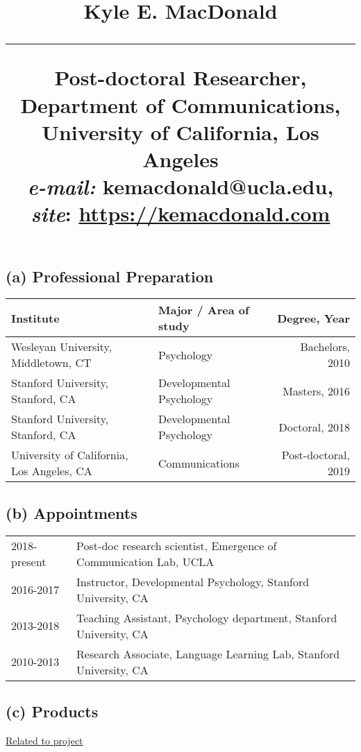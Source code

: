 \documentclass[svgnames,11pt]{article}
\title{%
        \vspace{-2\baselineskip}
            \normalsize
            {\textbf{Kyle E. MacDonald }}\\
            \vspace{0.5\baselineskip}
            \hrule
            \vspace{0.5\baselineskip}
            Post-doctoral Researcher, Department of Communications, University of California, Los Angeles\\
            \textit{e-mail:} kemacdonald@ucla.edu,
            \textit{site}: \href{https://kemacdonald.com}{https://kemacdonald.com}
        \vspace{-1.5ex}
}
\date{}
\begin{document}
\maketitle
\vspace{-4\baselineskip}
\subsection*{(a) Professional Preparation}
\begin{table}[H]
\centering
\begin{tabular}{llr}
\hline
Institute                                                & Major / Area of study         & Degree, Year            \\ \hline
Wesleyan University, Middletown, CT                      & Psychology     & Bachelors, 2010       \\
Stanford University, Stanford, CA                        & Developmental Psychology  & Masters, 2016       \\
Stanford University, Stanford, CA                        & Developmental Psychology  & Doctoral, 2018       \\
University of California, Los Angeles, CA                & Communications            & Post-doctoral, 2019
\end{tabular}
\end{table}

\subsection*{(b) Appointments}
\begin{table}[H]
\centering
\begin{tabular}{ll}
2018-present   & Post-doc research scientist, Emergence of Communication Lab, UCLA \\
2016-2017   & Instructor, Developmental Psychology, Stanford University, CA                \\
2013-2018   & Teaching Assistant, Psychology department, Stanford University, CA                   \\
2010-2013   & Research Associate, Language Learning Lab, Stanford University, CA                        
\end{tabular}
\end{table}
\subsection*{(c) Products}

\underline{Related to project}
\nocite{macdonald2018real}
\nocite{macdonald2018noise}
\nocite{macdonald2017information}
\nocite{macdonald2018children}
\nocite{macdonald2019integration}
\end{document}
